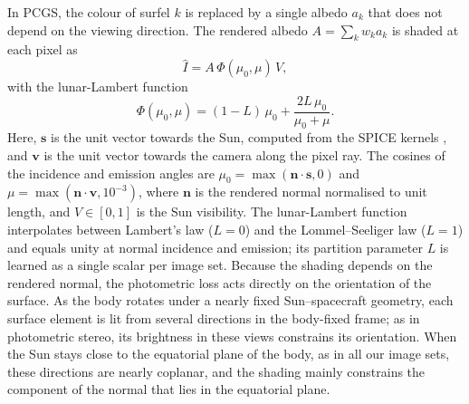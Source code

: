 \documentclass[fleqn,usenatbib]{aa}
\newcommand{\pcgs}{PCGS}
\newcommand{\mzero}{\mu_0}
\newcommand{\vect}[1]{\boldsymbol{#1}}
\begin{document}
In \pcgs, the colour of surfel $k$ is replaced by a single albedo $a_k$ that does not depend on the viewing direction.
The rendered albedo $A=\sum_k w_k a_k$ is shaded at each pixel as
\begin{equation}
\hat I = A\,\Phi(\mzero,\mu)\,V,
\label{eq:render}
\end{equation}
with the lunar-Lambert function \citep{McEwen1991}
\begin{equation}
\Phi(\mzero,\mu) = (1-L)\,\mzero + \frac{2L\,\mzero}{\mzero+\mu}.
\label{eq:ll}
\end{equation}
Here, $\vect{s}$ is the unit vector towards the Sun, computed from the SPICE kernels \citep{Acton1996}, and $\vect{v}$
is the unit vector towards the camera along the pixel ray. The cosines of the incidence and emission angles are
$\mzero=\max(\vect{n}\cdot\vect{s},0)$ and $\mu=\max(\vect{n}\cdot\vect{v},10^{-3})$, where $\vect{n}$ is the rendered
normal normalised to unit length, and $V\in[0,1]$ is the Sun visibility. The lunar-Lambert function interpolates
between Lambert's law ($L=0$) and the Lommel--Seeliger law ($L=1$) and equals unity at normal incidence and emission;
its partition parameter $L$ is learned as a single scalar per image set. Because the shading depends on the rendered
normal, the photometric loss acts directly on the orientation of the surface. As the body rotates under a nearly fixed
Sun--spacecraft geometry, each surface element is lit from several directions in the body-fixed frame; as in photometric stereo, its brightness
in these views constrains its orientation. When the Sun stays close to the
equatorial plane of the body, as in all our image sets, these directions are nearly coplanar, and the shading mainly
constrains the component of the normal that lies in the equatorial plane.
\end{document}
